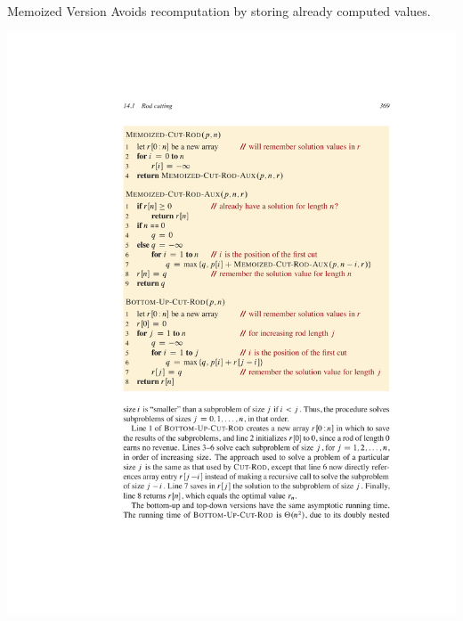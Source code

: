 \documentclass{beamer}
\begin{document}
\begin{frame}{Memoized Version}
    Avoids recomputation by storing already computed values.

    \centering
    \includegraphics[width=\textwidth,clip=true,trim=5cm 15.5cm 3cm 4cm]{figures/p369}
\end{frame}
\end{document}
